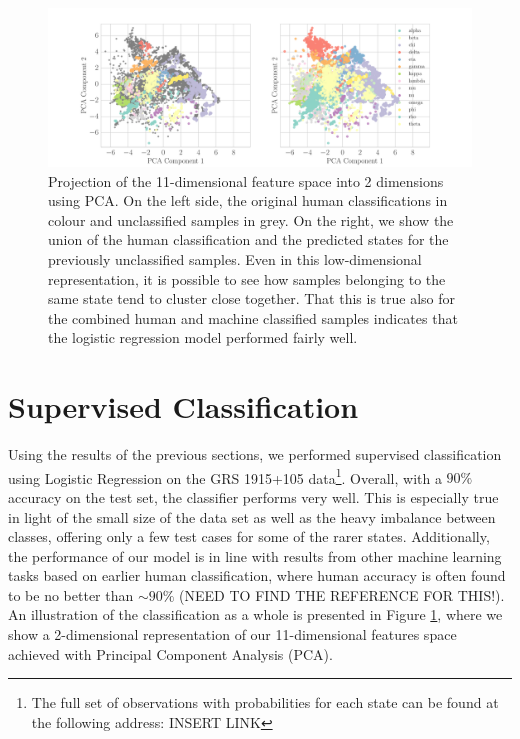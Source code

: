 \documentclass[12pt]{emulateapj}
\begin{document}
\begin{figure}[htbp]
\begin{center}
\includegraphics[width=\textwidth]{grs1915_supervised_pca_comparison.pdf}
\caption{Projection of the 11-dimensional feature space into 2 dimensions using PCA. On the left side, the original human classifications in colour and 
unclassified samples in grey. On the right, we show the union of the human classification and the predicted states for the previously unclassified samples. 
Even in this low-dimensional representation, it is possible to see how samples belonging to the same state tend to cluster close together. That this is true also 
for the combined human and machine classified samples indicates that the logistic regression model performed fairly well.} 
\label{fig:supervised_pca}
\end{center}
\end{figure}

\section{Supervised Classification}
\label{sec:supervised}

Using the results of the previous sections, we performed supervised classification using Logistic Regression on the GRS 1915+105 data\footnote{The full set of observations with probabilities for each state can be found at the following address: INSERT LINK}.
Overall, with a $90\%$ accuracy on the test set, the classifier performs very well. This is especially true in light of the small size of the data set as well
as the heavy imbalance between classes, offering only a few test cases for some of the rarer states. Additionally, the performance of our model is in 
line with results from other machine learning tasks based on earlier human classification, where human accuracy is often found to be no better than 
$\sim 90\%$ (NEED TO FIND THE REFERENCE FOR THIS!). An illustration of the classification as a whole is presented in Figure \ref{fig:supervised_pca}, 
where we show a 2-dimensional representation of our 11-dimensional features space achieved with Principal Component Analysis (PCA). 
\end{document}

